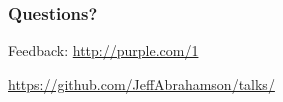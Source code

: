 \documentclass{beamer}
\newcommand\smallgray[1]{\textcolor{gray}{\footnotesize\it #1}}
\newcommand\prevwork[1]{\smallgray{#1}}
\begin{document}
\begin{frame}
  \frametitle{Questions?}

  \centerline{Feedback: \url{http://purple.com/1}}
  \vspace{1cm}
  \centerline{\url{https://github.com/JeffAbrahamson/talks/}}
\end{frame}

\end{document}
